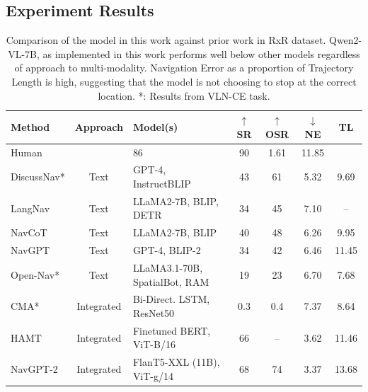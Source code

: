 \documentclass{svproc}
\begin{document}
\subsection{Experiment Results}
    \begin{table}
        \caption{Comparison of the model in this work against prior work in RxR dataset. Qwen2-VL-7B, as implemented in this work performs well below other models regardless of approach to multi-modality. Navigation Error as a proportion of Trajectory Length is high, suggesting that the model is not choosing to stop at the correct location. *: Results from VLN-CE task.}
        \renewcommand{\arraystretch}{1.1}
        \begin{center}
            \begin{tabular}{lclcccc}
                \hline
                \multicolumn{1}{l}{Method}&
                \multicolumn{1}{l}{Approach}&
                \multicolumn{1}{l}{Model(s)}&
                \multicolumn{1}{c}{$\uparrow$SR}&
                \multicolumn{1}{c}{$\uparrow$OSR}&
                \multicolumn{1}{c}{$\downarrow$NE}&
                \multicolumn{1}{c}{TL}
                \\
                \hline
                Human \cite{mattersim} &   &   86 & 90 & 1.61 & 11.85\\
                \hline
                DiscussNav* \cite{long2023_discussnav} & Text & GPT-4, InstructBLIP & 43 & 61 & 5.32 & 9.69 \\
                LangNav\cite{pan2024langnavlanguageperceptualrepresentation} & Text & LLaMA2-7B, BLIP, DETR & 34 & 45 & 7.10 & -- \\
                NavCoT \cite{lin2024navcotboostingllmbasedvisionandlanguage} & Text & LLaMA2-7B, BLIP & 40 & 48 & 6.26 & 9.95 \\
                NavGPT \cite{zhou2023navgptexplicitreasoningvisionandlanguage} & Text & GPT-4, BLIP-2 & 34 & 42 & 6.46 & 11.45\\
                Open-Nav* \cite{open-nav} & Text & LLaMA3.1-70B, SpatialBot, RAM & 19 & 23 & 6.70 & 7.68 \\
                \hline
                CMA* \cite{krantz2020navgraphvisionandlanguagenavigationcontinuous} & Integrated & Bi-Direct. LSTM, ResNet50 & 0.3 & 0.4 & 7.37 & 8.64 \\
                HAMT \cite{chen2021_HAMT} & Integrated & Finetuned BERT, ViT-B/16 & 66 & -- & 3.62 & 11.46 \\
                NavGPT-2 \cite{navgpt2} & Integrated & FlanT5-XXL (11B), ViT-g/14 & 68 & 74 & 3.37 & 13.68 \\

\end{tabular}
\end{center}
\end{table}
\end{document}
